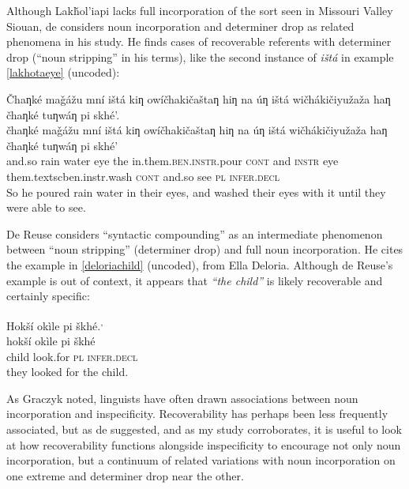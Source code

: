 \documentclass[output=paper]{LSP/langsci}
\begin{document}
	Although Lakȟol’iapi lacks full incorporation of the sort seen in Missouri Valley Siouan, de \citet{Reuse1994} considers noun incorporation and determiner drop as related phenomena in his study. He finds cases of recoverable referents with determiner drop (“noun stripping” in his terms), like the second instance of \emph{ištá} in example \ref{lakhotaeye} (uncoded):
	
\ea\label{lakhotaeye}
 	Čhaƞké maǧážu mní ištá kiƞ owíčhakičaštaƞ hiƞ na úƞ ištá wičhákičiyužaža haƞ čhaƞké tuƞwáƞ pi skhé’.\footnotemark\\
\gll	čhaƞké	maǧážu	mní	ištá	kiƞ	owíčhakičaštaƞ			hiƞ			na	úƞ			ištá		wičhákičiyužaža			haƞ			čhaƞké		tuƞwáƞ	pi		skhé’\\
	and.so	rain		water	eye	the	in.them.\textsc{ben.instr}.pour	\textsc{cont}	and	\textsc{instr}	eye		them.textsc{ben.instr}.wash	\textsc{cont}	and.so	see		\textsc{pl}	\textsc{infer.decl}\\
\glt	So he poured rain water in their eyes, and washed their eyes with it until they were able to see.
\z

De Reuse considers “syntactic compounding” as an intermediate phenomenon between “noun stripping” (determiner drop) and full noun incorporation. He cites the example in \ref{deloriachild} (uncoded), from Ella Deloria. Although de Reuse’s example is out of context, it appears that \emph{“the child”} is likely recoverable and certainly specific:

\ea\label{deloriachild}
 	Hokší okìle pi škhé.\footnotemark\textsuperscript{,} \footnotemark\\
\gll	hokší		okìle		pi			škhé\\
	child		look.for	\textsc{pl}		\textsc{infer.decl}\\
\glt	they looked for the child. 
\z

	As Graczyk noted, linguists have often drawn associations between noun incorporation and inspecificity. Recoverability has perhaps been less frequently associated, but as de \citet{Reuse1994} suggested, and as my study corroborates, it is useful to look at how recoverability functions alongside inspecificity to encourage not only noun incorporation, but a continuum of related variations with noun incorporation on one extreme and determiner drop near the other.
	
\end{document}

